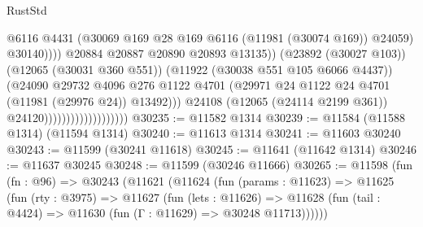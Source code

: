 \begin{lexlean}{RustStd}
\begin{coremodule}
                                                        @6116
                                                        @4431
                                                        (@30069
                                                          @169
                                                          @28
                                                          @169
                                                          @6116
                                                          (@11981 (@30074 @169))
                                                          @24059)
                                                        @30140))))
                                                @20884
                                                @20887
                                                @20890
                                                @20893
                                                @13135))
                                            (@23892 (@30027 @103))
                                            (@12065 (@30031 @360 @551))
                                            (@11922 (@30038 @551 @105 @6066 @4437))
                                            (@24090
                                              @29732
                                              @4096
                                              @276
                                              @1122
                                              @4701
                                              (@29971
                                                @24
                                                @1122
                                                @24
                                                @4701
                                                (@11981 (@29976 @24))
                                                @13492)))
                                          @24108
                                          (@12065 (@24114 @2199 @361))
                                          @24120)))))))))))))))))))
@30235 := @11582 @1314
@30239 := @11584 (@11588 @1314) (@11594 @1314)
@30240 := @11613 @1314
@30241 := @11603 @30240
@30243 := @11599 (@30241 @11618)
@30245 := @11641 (@11642 @1314)
@30246 := @11637 @30245
@30248 := @11599 (@30246 @11666)
@30265 := @11598
    (fun (fn : @96) =>
    @30243
      (@11621
        (@11624
          (fun (params : @11623) =>
          @11625
            (fun (rty : @3975) =>
            @11627
              (fun (lets : @11626) =>
              @11628 (fun (tail : @4424) => @11630 (fun (Γ : @11629) => @30248 @11713))))))

\end{coremodule}
\end{lexlean}
